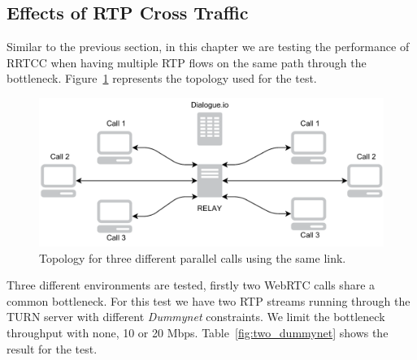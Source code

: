 \subsection{Effects of RTP Cross Traffic}

Similar to the previous section, in this chapter we are testing the performance of RRTCC when having multiple RTP flows on the same path through the bottleneck. Figure~\ref{fig:parallelCalls} represents the topology used for the test.

 \begin{figure}[h]
  \centering
    \includegraphics[width=1\textwidth]{./figures/ParallelCalls.pdf}
      \caption[Topology for three different parallel calls using the same link]{Topology for three different parallel calls using the same link.}
	\label{fig:parallelCalls}
\end{figure}

Three different environments are tested, firstly two WebRTC calls share a common bottleneck. For this test we have two RTP streams running through the TURN server with different {\it Dummynet} constraints. We limit the bottleneck throughput with none, 10 or 20 Mbps. Table~\ref{fig:two_dummynet} shows the result for the test.


